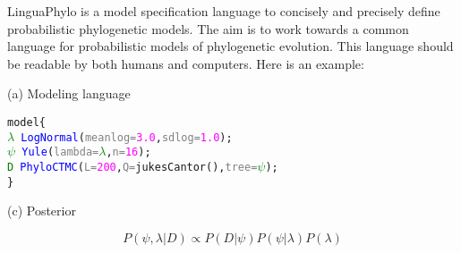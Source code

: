 \documentclass[oneside]{article}
\begin{document}
LinguaPhylo is a model specification language to concisely and
precisely define probabilistic phylogenetic models.
The aim is to work
towards a common language for probabilistic models of phylogenetic
evolution.
This language should be readable by both humans and
computers.
Here is an example:

\begin{tcolorbox}[breakable, width=\textwidth, colback=gray!10, boxrule=0pt,
  title=Box 1: A simple molecular phylogenetic model, fonttitle=\bfseries]
  \begin{minipage}[t]{0.60\textwidth}
  (a) Modeling language
\\
    {\singlespacing
\begin{alltt}
model \{
  \textcolor{green}{\(\lambda\)} ~ \textcolor{blue}{LogNormal}(\textcolor{gray}{meanlog=}\textcolor{magenta}{3.0}, \textcolor{gray}{sdlog=}\textcolor{magenta}{1.0});
  \textcolor{green}{\(\psi\)} ~ \textcolor{blue}{Yule}(\textcolor{gray}{lambda=}\textcolor{green}{\(\lambda\)}, \textcolor{gray}{n=}\textcolor{magenta}{16});
  \textcolor{green}{D} ~ \textcolor{blue}{PhyloCTMC}(\textcolor{gray}{L=}\textcolor{magenta}{200}, \textcolor{gray}{Q=}\textcolor{magenta!80!black}{jukesCantor}(), \textcolor{gray}{tree=}\textcolor{green}{\(\psi\)});
\}
\end{alltt}
}
(c) Posterior

$$P(\psi, \lambda | D) \propto P(D | \psi) P(\psi | \lambda) P(\lambda) $$


\end{minipage}
\end{tcolorbox}
\end{document}
